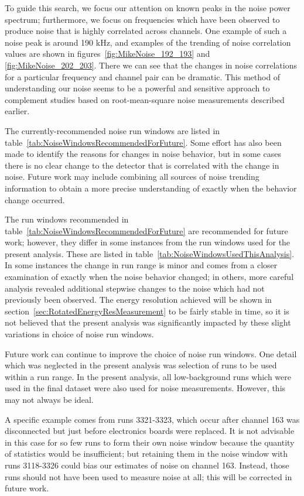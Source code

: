 To guide this search, we focus our attention on known peaks in the noise power spectrum; furthermore, we focus on frequencies which have been observed to produce noise that is highly correlated across channels.  One example of such a noise peak is around 190 kHz, and examples of the trending of noise correlation values are shown in figures~\ref{fig:MikeNoise_192_193} and \ref{fig:MikeNoise_202_203}.  There we can see that the changes in noise correlations for a particular frequency and channel pair can be dramatic.  This method of understanding our noise seems to be a powerful and sensitive approach to complement studies based on root-mean-square noise measurements described earlier.

The currently-recommended noise run windows are listed in table~\ref{tab:NoiseWindowsRecommendedForFuture}.  Some effort has also been made to identify the reasons for changes in noise behavior, but in some cases there is no clear change to the detector that is correlated with the change in noise.  Future work may include combining all sources of noise trending information to obtain a more precise understanding of exactly when the behavior change occurred.

The run windows recommended in table~\ref{tab:NoiseWindowsRecommendedForFuture} are recommended for future work; however, they differ in some instances from the run windows used for the present analysis.  These are listed in table~\ref{tab:NoiseWindowsUsedThisAnalysis}.  In some instances the change in run range is minor and comes from a closer examination of exactly when the noise behavior changed; in others, more careful analysis revealed additional stepwise changes to the noise which had not previously been observed.  The energy resolution achieved will be shown in section~\ref{sec:RotatedEnergyResMeasurement} to be fairly stable in time, so it is not believed that the present analysis was significantly impacted by these slight variations in choice of noise run windows.

Future work can continue to improve the choice of noise run windows.  One detail which was neglected in the present analysis was selection of runs to be used within a run range.  In the present analysis, all low-background runs which were used in the final dataset were also used for noise measurements.  However, this may not always be ideal.

A specific example comes from runs 3321-3323, which occur after channel 163 was disconnected but just before electronics boards were replaced.  It is not advisable in this case for so few runs to form their own noise window because the quantity of statistics would be insufficient; but retaining them in the noise window with runs 3118-3326 could bias our estimates of noise on channel 163.  Instead, those runs should not have been used to measure noise at all; this will be corrected in future work.

